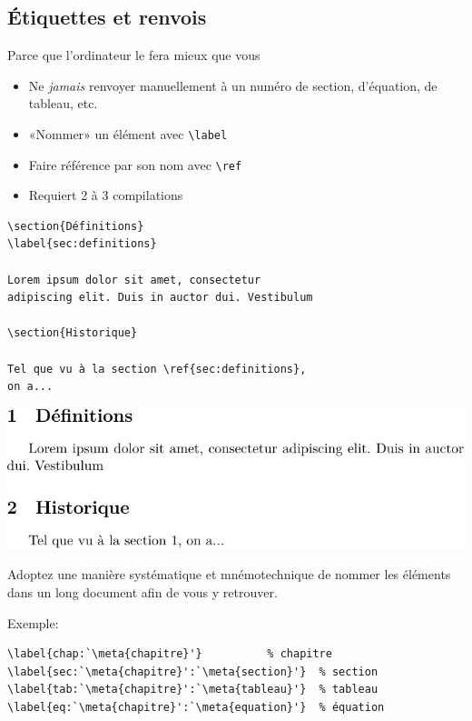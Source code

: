 \subsection{Étiquettes et renvois}

Parce que l'ordinateur le fera mieux que vous

\begin{itemize}
\item Ne \emph{jamais} renvoyer manuellement à un numéro de section,
  d'équation, de tableau, etc.
\item «Nommer» un élément avec \verb=\label=
\item Faire référence par son nom avec \verb=\ref=
\item Requiert 2 à 3 compilations
\end{itemize}

\begin{demo}
\begin{lstlisting}[emph={\label,\ref}]
\section{Définitions}
\label{sec:definitions}

Lorem ipsum dolor sit amet, consectetur
adipiscing elit. Duis in auctor dui. Vestibulum

\section{Historique}

Tel que vu à la section \ref{sec:definitions},
on a...
\end{lstlisting}
  \begin{framed}
    \includegraphics[width=\linewidth]{renvoi}
  \end{framed}
\end{demo}

\begin{conseil}
  Adoptez une manière systématique et mnémotechnique de nommer les
  éléments dans un long document afin de vous y retrouver.

  \bigskip %
  Exemple:
\begin{lstlisting}
\label{chap:`\meta{chapitre}'}          % chapitre
\label{sec:`\meta{chapitre}':`\meta{section}'}  % section
\label{tab:`\meta{chapitre}':`\meta{tableau}'}  % tableau
\label{eq:`\meta{chapitre}':`\meta{equation}'}  % équation
\end{lstlisting}
\end{conseil}


